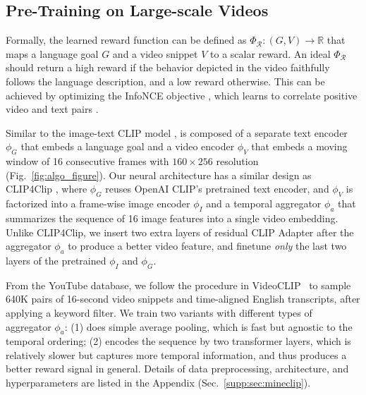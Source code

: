 

\subsection{Pre-Training \mineclip on Large-scale Videos}
\label{sec:method-mineclip-pretraining}

Formally, the learned reward function can be defined as $\Phi_\mathcal{R}: (G, V) \rightarrow \mathbb{R}$ that maps a language goal $G$ and a video snippet $V$ to a scalar reward. An ideal $\Phi_\mathcal{R}$ should return a high reward if the behavior depicted in the video faithfully follows the language description, and a low reward otherwise. This can be achieved by optimizing the InfoNCE objective \cite{oord2018representation, DBLP:conf/cvpr/He0WXG20, DBLP:conf/icml/ChenK0H20}, which learns to correlate positive video and text pairs \cite{sun2019learning, DBLP:conf/nips/AlayracRSARFSDZ20, DBLP:conf/cvpr/MiechASLSZ20, akbari2021vatt, xu2021videoclip}. 

Similar to the image-text CLIP model \cite{radford2021clip}, \mineclip is composed of a separate text encoder $\phi_G$ that embeds a language goal and a video encoder $\phi_V$ that embeds a moving window of 16 consecutive frames with $160 \times 256$ resolution (Fig.~\ref{fig:algo_figure}). Our neural architecture has a similar design as CLIP4Clip \cite{luo2021clip4clip}, where $\phi_G$ reuses OpenAI CLIP's pretrained text encoder, and $\phi_V$ is factorized into a frame-wise image encoder $\phi_I$ and a temporal aggregator $\phi_a$ that summarizes the sequence of 16 image features into a single video embedding. Unlike CLIP4Clip, we insert two extra layers of residual CLIP Adapter \cite{gao2021clipadapter} after the aggregator $\phi_a$ to produce a better video feature, and finetune \textit{only} the last two layers of the pretrained $\phi_I$ and $\phi_G$.

From the \minedojo YouTube database, we follow the procedure in VideoCLIP~\cite{xu2021videoclip} to sample 640K pairs of 16-second video snippets and time-aligned English transcripts, after applying a keyword filter. 
We train two \mineclip variants with different types of aggregator $\phi_a$: (1) \mineclipavg does simple average pooling, which is fast but agnostic to the temporal ordering; (2) \mineclipattn encodes the sequence by two transformer layers, which is relatively slower but captures more temporal information, and thus produces a better reward signal in general. 
Details of data preprocessing, architecture, and hyperparameters are listed in the Appendix (Sec.~\ref{supp:sec:mineclip}). 

